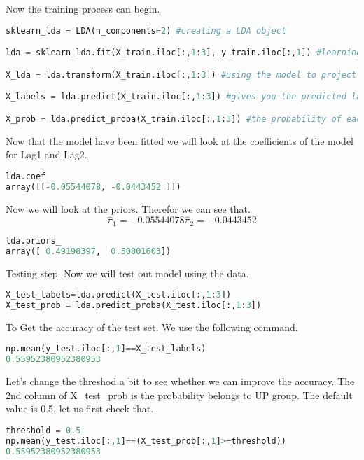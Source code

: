 Now the training process can begin.

\begin{lstlisting}[language=Python]
sklearn_lda = LDA(n_components=2) #creating a LDA object

lda = sklearn_lda.fit(X_train.iloc[:,1:3], y_train.iloc[:,1]) #learning the projection matrix

X_lda = lda.transform(X_train.iloc[:,1:3]) #using the model to project X. Project data to maximize class separation.

X_labels = lda.predict(X_train.iloc[:,1:3]) #gives you the predicted label for each sample

X_prob = lda.predict_proba(X_train.iloc[:,1:3]) #the probability of each sample to belong to each class
\end{lstlisting}

Now that the model have been fitted we will look at the coefficients of the model for Lag1 and Lag2.

\begin{lstlisting}[language=Python]
lda.coef_
array([[-0.05544078, -0.0443452 ]])
\end{lstlisting}

Now we will look at the priors. Therefor we can see that. $$ \hat{ \pi }_1 = -0.05544078  \hat{ \pi }_2 = -0.0443452 $$ 
\begin{lstlisting}[language=Python]
lda.priors_
array([ 0.49198397,  0.50801603])
\end{lstlisting}

Testing step. Now we will test out model using the data.
\begin{lstlisting}[language=Python]
X_test_labels=lda.predict(X_test.iloc[:,1:3])
X_test_prob = lda.predict_proba(X_test.iloc[:,1:3])
\end{lstlisting}

To Get the accuracy of the test set. We use the following command.

\begin{lstlisting}[language=Python]
np.mean(y_test.iloc[:,1]==X_test_labels)
0.55952380952380953
\end{lstlisting}

Let's change the threshod a bit to see whether we can improve the accuracy. The 2nd column of X\_test\_prob is the probability belongs to UP group. The default value is 0.5, let us first check that.

\begin{lstlisting}[language=Python]
threshold = 0.5 
np.mean(y_test.iloc[:,1]==(X_test_prob[:,1]>=threshold))
0.55952380952380953
\end{lstlisting}

